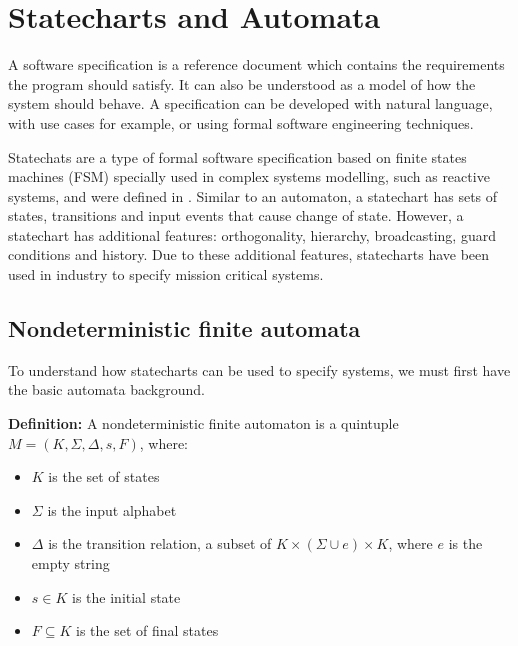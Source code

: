 \section{Statecharts and Automata}
\label{sec:statecharts}

A software specification is a reference document which contains the requirements the program should satisfy. It can also be understood as a model of how the system should behave. A specification can be developed with natural language, with use cases for example, or using formal software engineering techniques.

Statechats are a type of formal software specification based on finite states machines (FSM) specially used in complex systems modelling, such as reactive systems, and were defined in \cite{harel87:semantics_statecharts}. Similar to an automaton, a statechart has sets of states, transitions and input events that cause change of state. However, a statechart has additional features: orthogonality, hierarchy, broadcasting, guard conditions and history. Due to these additional features, statecharts have been used in industry to specify mission critical systems.

\subsection{Nondeterministic finite automata}

To understand how statecharts can be used to specify systems, we must first have the basic automata background.

\textbf{Definition\cite{Lewis:98}:} A nondeterministic finite automaton is a quintuple $M = (K,\Sigma,\Delta,s,F)$, where:

\begin{itemize}

\item $K$ is the set of states

\item $\Sigma$ is the input alphabet

\item $\Delta$ is the transition relation, a subset of $K\times(\Sigma\cup{e})\times K$, where $e$ is the empty string

\item $s \in K$ is the initial state

\item $F \subseteq K$ is the set of final states
\end{itemize}

